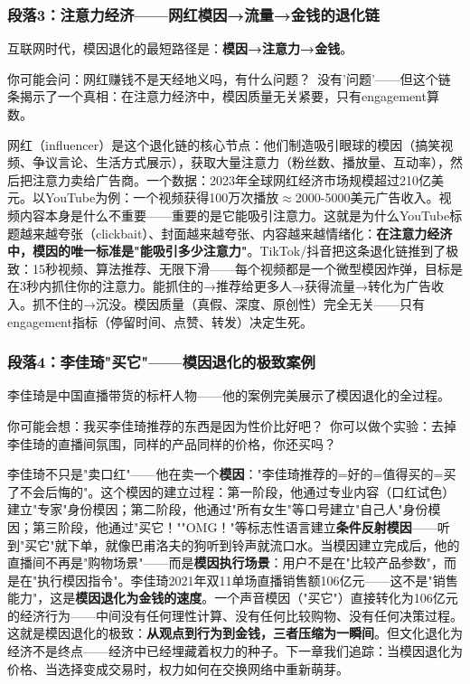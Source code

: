 \documentclass[../main.tex]{subfiles}
\begin{document}
	\subsubsection*{段落3：注意力经济——网红模因→流量→金钱的退化链}

	互联网时代，模因退化的最短路径是：\textbf{模因→注意力→金钱}。

	\begin{tcolorbox}[colback=yellow!5, title=\textit{读者行为预测}]

		你可能会问：网红赚钱不是天经地义吗，有什么问题？\ 没有'问题'——但这个链条揭示了一个真相：在注意力经济中，模因质量无关紧要，只有engagement算数。

	\end{tcolorbox}

网红（influencer）是这个退化链的核心节点：他们制造吸引眼球的模因（搞笑视频、争议言论、生活方式展示），获取大量注意力（粉丝数、播放量、互动率），然后把注意力卖给广告商。一个数据：2023年全球网红经济市场规模超过210亿美元。以YouTube为例：一个视频获得100万次播放$\approx$2000-5000美元广告收入。视频内容本身是什么不重要——重要的是它能吸引注意力。这就是为什么YouTube标题越来越夸张（clickbait）、封面越来越夸张、内容越来越情绪化：\textbf{在注意力经济中，模因的唯一标准是"能吸引多少注意力"}。TikTok/抖音把这条退化链推到了极致：15秒视频、算法推荐、无限下滑——每个视频都是一个微型模因炸弹，目标是在3秒内抓住你的注意力。能抓住的→推荐给更多人→获得流量→转化为广告收入。抓不住的→沉没。模因质量（真假、深度、原创性）完全无关——只有engagement指标（停留时间、点赞、转发）决定生死。

	\subsubsection*{段落4：李佳琦"买它"——模因退化的极致案例}

	李佳琦是中国直播带货的标杆人物——他的案例完美展示了模因退化的全过程。

	\begin{tcolorbox}[colback=yellow!5, title=\textit{读者行为预测}]

		你可能会想：我买李佳琦推荐的东西是因为性价比好吧？\ 你可以做个实验：去掉李佳琦的直播间氛围，同样的产品同样的价格，你还买吗？

	\end{tcolorbox}

李佳琦不只是"卖口红"——他在卖一个\textbf{模因}："李佳琦推荐的=好的=值得买的=买了不会后悔的"。这个模因的建立过程：第一阶段，他通过专业内容（口红试色）建立"专家"身份模因；第二阶段，他通过"所有女生"等口号建立"自己人"身份模因；第三阶段，他通过"买它！""OMG！"等标志性语言建立\textbf{条件反射模因}——听到"买它"就下单，就像巴甫洛夫的狗听到铃声就流口水。当模因建立完成后，他的直播间不再是"购物场景"——而是\textbf{模因执行场景}：用户不是在"比较产品参数"，而是在"执行模因指令"。李佳琦2021年双11单场直播销售额106亿元——这不是"销售能力"，这是\textbf{模因退化为金钱的速度}。一个声音模因（"买它"）直接转化为106亿元的经济行为——中间没有任何理性计算、没有任何比较购物、没有任何决策过程。这就是模因退化的极致：\textbf{从观点到行为到金钱，三者压缩为一瞬间}。但文化退化为经济不是终点——经济中已经埋藏着权力的种子。下一章我们追踪：当模因退化为价格、当选择变成交易时，权力如何在交换网络中重新萌芽。
\end{document}
